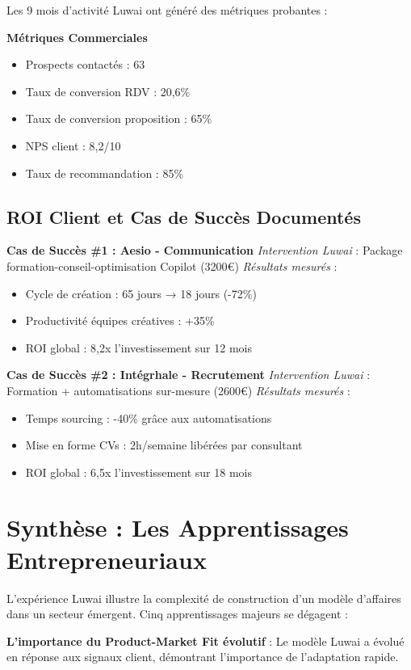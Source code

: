 \documentclass[12pt,a4paper]{report}
\begin{document}
Les 9 mois d'activité Luwai ont généré des métriques probantes :

\textbf{Métriques Commerciales}
\begin{itemize}
\item Prospects contactés : 63
\item Taux de conversion RDV : 20,6\%
\item Taux de conversion proposition : 65\%
\item NPS client : 8,2/10
\item Taux de recommandation : 85\%
\end{itemize}

\subsection{ROI Client et Cas de Succès Documentés}

\textbf{Cas de Succès \#1 : Aesio - Communication}
\emph{Intervention Luwai} : Package formation-conseil-optimisation Copilot (3200€)
\emph{Résultats mesurés} :
\begin{itemize}
\item Cycle de création : 65 jours → 18 jours (-72\%)
\item Productivité équipes créatives : +35\%
\item ROI global : 8,2x l'investissement sur 12 mois
\end{itemize}

\textbf{Cas de Succès \#2 : Intégrhale - Recrutement}
\emph{Intervention Luwai} : Formation + automatisations sur-mesure (2600€)
\emph{Résultats mesurés} :
\begin{itemize}
\item Temps sourcing : -40\% grâce aux automatisations
\item Mise en forme CVs : 2h/semaine libérées par consultant
\item ROI global : 6,5x l'investissement sur 18 mois
\end{itemize}

\section{Synthèse : Les Apprentissages Entrepreneuriaux}

L'expérience Luwai illustre la complexité de construction d'un modèle d'affaires dans un secteur émergent. Cinq apprentissages majeurs se dégagent :

\textbf{L'importance du Product-Market Fit évolutif} : Le modèle Luwai a évolué en réponse aux signaux client, démontrant l'importance de l'adaptation rapide.
\end{document}
